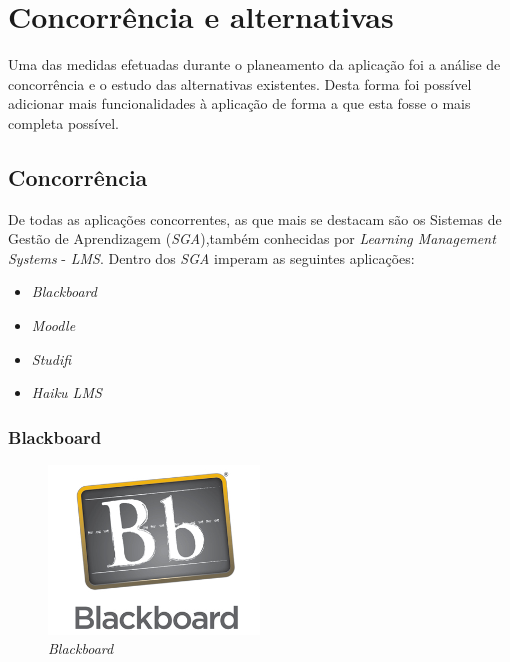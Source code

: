 \section{Concorrência e alternativas}

Uma das medidas efetuadas durante o planeamento da aplicação foi a análise de concorrência e o estudo das alternativas existentes. Desta forma foi possível adicionar mais funcionalidades à aplicação de forma a que esta fosse o mais completa possível.

\subsection{Concorrência} %
\label{sub:concorrencia}

De todas as aplicações concorrentes, as que mais se destacam são os Sistemas de Gestão de Aprendizagem (\emph{SGA}),também conhecidas por \emph{Learning Management Systems} - \emph{LMS}. Dentro dos \emph{SGA} imperam as seguintes aplicações:
\begin{itemize}
	\item \emph{Blackboard}
	\item \emph{Moodle}
	\item \emph{Studifi}
	\item \emph{Haiku LMS}
\end{itemize}

\subsubsection{Blackboard} %
\label{ssub:blackboard}

\begin{figure}[H]
        \centering
        \includegraphics[width=0.5\textwidth]{images/concorrencia/blackboard.jpg}
         \caption{\emph{Blackboard}}
         \label{fig: blackboard}
\end{figure}

